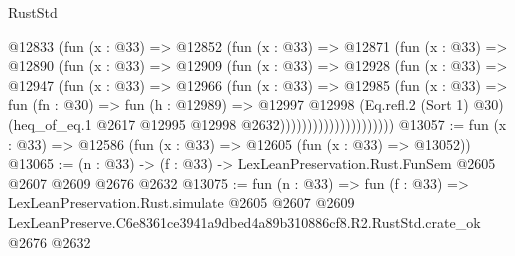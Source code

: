 \begin{lexlean}{RustStd}
\begin{coremodule}
                        @12833
                          (fun (x : @33) =>
                          @12852
                            (fun (x : @33) =>
                            @12871
                              (fun (x : @33) =>
                              @12890
                                (fun (x : @33) =>
                                @12909
                                  (fun (x : @33) =>
                                  @12928
                                    (fun (x : @33) =>
                                    @12947
                                      (fun (x : @33) =>
                                      @12966
                                        (fun (x : @33) =>
                                        @12985
                                          (fun (x : @33) =>
                                          fun (fn : @30) =>
                                          fun (h : @12989) =>
                                          @12997
                                            @12998
                                            (Eq.refl.{2} (Sort 1) @30)
                                            (heq_of_eq.{1}
                                              @2617
                                              @12995
                                              @12998
                                              @2632)))))))))))))))))))))
@13057 := fun (x : @33) => @12586 (fun (x : @33) => @12605 (fun (x : @33) => @13052))
@13065 := (n : @33) -> (f : @33) -> LexLeanPreservation.Rust.FunSem @2605 @2607 @2609 @2676 @2632
@13075 := fun (n : @33) =>
  fun (f : @33) =>
  LexLeanPreservation.Rust.simulate
    @2605
    @2607
    @2609
    LexLeanPreserve.C6e8361ce3941a9dbed4a89b310886cf8.R2.RustStd.crate_ok
    @2676
    @2632
\end{coremodule}
\end{lexlean}
